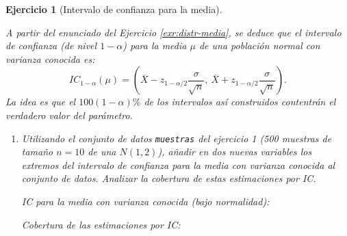 \documentclass[
  10pt,
]{book}
\newenvironment{Shaded}{\begin{snugshade}}{\end{snugshade}}
\newcommand{\CommentTok}[1]{\textcolor[rgb]{0.56,0.35,0.01}{\textit{#1}}}
\newcommand{\DecValTok}[1]{\textcolor[rgb]{0.00,0.00,0.81}{#1}}
\newcommand{\FloatTok}[1]{\textcolor[rgb]{0.00,0.00,0.81}{#1}}
\newcommand{\FunctionTok}[1]{\textcolor[rgb]{0.00,0.00,0.00}{#1}}
\newcommand{\NormalTok}[1]{#1}
\newcommand{\OtherTok}[1]{\textcolor[rgb]{0.56,0.35,0.01}{#1}}
\newcommand{\SpecialCharTok}[1]{\textcolor[rgb]{0.00,0.00,0.00}{#1}}
\theoremstyle{break}
\newtheorem{exercise}{Ejercicio}[chapter]
\theoremstyle{nonumberplain}
\renewcommand{\CommentTok}[1]{\textcolor[rgb]{0.41,0.41,0.41}{\texttt{#1}}}
\begin{document}
\begin{exercise}[Intervalo de confianza para la media]
\protect\hypertarget{exr:ic-media}{}\label{exr:ic-media}

A partir del enunciado del Ejercicio \ref{exr:distr-media}, se deduce que el intervalo de confianza (de nivel \(1-\alpha\)) para la media \(\mu\) de una población normal con varianza conocida es:
\[IC_{1-\alpha}\left(  \mu\right)  = 
\left(  \overline{X}-z_{1-\alpha/2}\dfrac{\sigma}{\sqrt{n}},\ \overline{X} 
+ z_{1-\alpha/2}\dfrac{\sigma}{\sqrt{n}} \right).\]
La idea es que el \(100(1-\alpha)\%\) de los intervalos así construidos contentrán el verdadero valor del parámetro.

\begin{enumerate}
\def\labelenumi{\alph{enumi})}
\item
  Utilizando el conjunto de datos \texttt{muestras} del ejercicio 1 (500
  muestras de tamaño \(n=10\) de una \(N(1,2)\)), añadir en dos nuevas
  variables los extremos del intervalo de confianza para la media
  con varianza conocida al conjunto de datos. Analizar la
  cobertura de estas estimaciones por IC.

  IC para la media con varianza conocida (bajo normalidad):

\begin{Shaded}
\end{Shaded}

  Cobertura de las estimaciones por IC:

\begin{Shaded}
\end{Shaded}


\end{enumerate}
\end{exercise}
\end{document}
